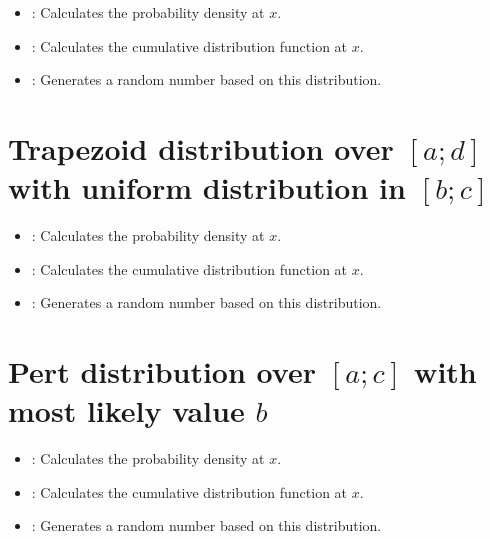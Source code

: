 \begin{itemize}

\item
{}:
Calculates the probability density at $x$.

\item
{}:
Calculates the cumulative distribution function at $x$.

\item
{}:
Generates a random number based on this distribution.

\end{itemize}



\section{Trapezoid distribution over \texorpdfstring{$[a;d]$}{[a;d]} with uniform distribution in \texorpdfstring{$[b;c]$}{[b;c]}}

\begin{itemize}

\item
{}:
Calculates the probability density at $x$.

\item
{}:
Calculates the cumulative distribution function at $x$.

\item
{}:
Generates a random number based on this distribution.

\end{itemize}



\section{Pert distribution over \texorpdfstring{$[a;c]$}{[a;c]} with most likely value \texorpdfstring{$b$}{b}}

\begin{itemize}

\item
{}:
Calculates the probability density at $x$.

\item
{}:
Calculates the cumulative distribution function at $x$.

\item
{}:
Generates a random number based on this distribution.

\end{itemize}



